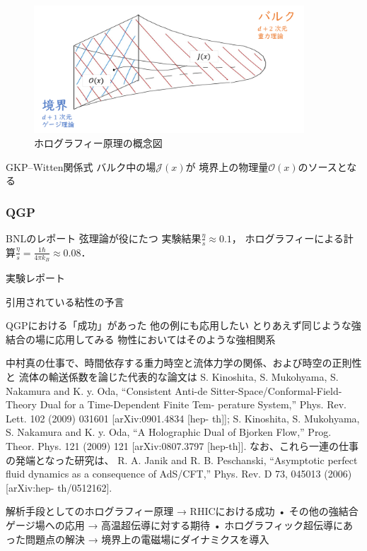 \documentclass[b5paper,11pt,dvipdfmx]{jsarticle}
\numberwithin{equation}{section}
\theoremstyle{definition}
\begin{document}
\begin{figure}[t]
    \centering
    \includegraphics[width=0.9\textwidth]{holography.png}
    \caption{ホログラフィー原理の概念図}
    \label{fig:holography}
\end{figure}


GKP--Witten関係式
バルク中の場$\mathcal{J}(x)$が
境界上の物理量$\mathcal{O}(x)$のソースとなる
\cite{Gubser98,Witten98}


\subsubsection{QGP}
BNLのレポート
弦理論が役にたつ
実験結果$\frac{\eta}{s} \approx 0.1$，
ホログラフィーによる計算$\frac{\eta}{s} = \frac{1 \hbar}{4 \pi k_B} \approx 0.08$．

実験レポート
\cite{PHENIX06}

引用されている粘性の予言
\cite{Kovtun04}

QGPにおける「成功」があった
他の例にも応用したい
とりあえず同じような強結合の場に応用してみる
物性においてはそのような強相関系

中村真の仕事で、時間依存する重力時空と流体力学の関係、および時空の正則性と
流体の輸送係数を論じた代表的な論文は
S. Kinoshita, S. Mukohyama, S. Nakamura and K. y. Oda, “Consistent Anti-de
Sitter-Space/Conformal-Field-Theory Dual for a Time-Dependent Finite Tem-
perature System,” Phys. Rev. Lett. 102 (2009) 031601 [arXiv:0901.4834 [hep-
th]];
S. Kinoshita, S. Mukohyama, S. Nakamura and K. y. Oda, “A Holographic
Dual of Bjorken Flow,” Prog. Theor. Phys. 121 (2009) 121 [arXiv:0807.3797
[hep-th]].
なお、これら一連の仕事の発端となった研究は、
R. A. Janik and R. B. Peschanski, “Asymptotic perfect fluid dynamics as
a consequence of AdS/CFT,” Phys. Rev. D 73, 045013 (2006) [arXiv:hep-
th/0512162].




解析手段としてのホログラフィー原理
→ RHICにおける成功
• その他の強結合ゲージ場への応用
→ 高温超伝導に対する期待
• ホログラフィック超伝導にあった問題点の解決
→ 境界上の電磁場にダイナミクスを導入
\end{document}
